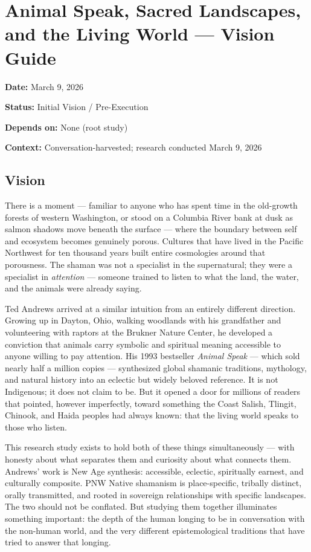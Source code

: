\documentclass[11pt,letterpaper]{article}
\newcommand{\metafield}[2]{\textbf{\sffamily #1} #2\par}
\begin{document}
\section{Animal Speak, Sacred Landscapes, and the Living World --- Vision Guide}

\metafield{Date:}{March 9, 2026}
\metafield{Status:}{Initial Vision / Pre-Execution}
\metafield{Depends on:}{None (root study)}
\metafield{Context:}{Conversation-harvested; research conducted March 9, 2026}

\subsection{Vision}

There is a moment --- familiar to anyone who has spent time in the old-growth forests of western Washington, or stood on a Columbia River bank at dusk as salmon shadows move beneath the surface --- where the boundary between self and ecosystem becomes genuinely porous. Cultures that have lived in the Pacific Northwest for ten thousand years built entire cosmologies around that porousness. The shaman was not a specialist in the supernatural; they were a specialist in \emph{attention} --- someone trained to listen to what the land, the water, and the animals were already saying.

Ted Andrews arrived at a similar intuition from an entirely different direction. Growing up in Dayton, Ohio, walking woodlands with his grandfather and volunteering with raptors at the Brukner Nature Center, he developed a conviction that animals carry symbolic and spiritual meaning accessible to anyone willing to pay attention. His 1993 bestseller \emph{Animal Speak} --- which sold nearly half a million copies --- synthesized global shamanic traditions, mythology, and natural history into an eclectic but widely beloved reference. It is not Indigenous; it does not claim to be. But it opened a door for millions of readers that pointed, however imperfectly, toward something the Coast Salish, Tlingit, Chinook, and Haida peoples had always known: that the living world speaks to those who listen.

This research study exists to hold both of these things simultaneously --- with honesty about what separates them and curiosity about what connects them. Andrews' work is New Age synthesis: accessible, eclectic, spiritually earnest, and culturally composite. PNW Native shamanism is place-specific, tribally distinct, orally transmitted, and rooted in sovereign relationships with specific landscapes. The two should not be conflated. But studying them together illuminates something important: the depth of the human longing to be in conversation with the non-human world, and the very different epistemological traditions that have tried to answer that longing.
\end{document}
